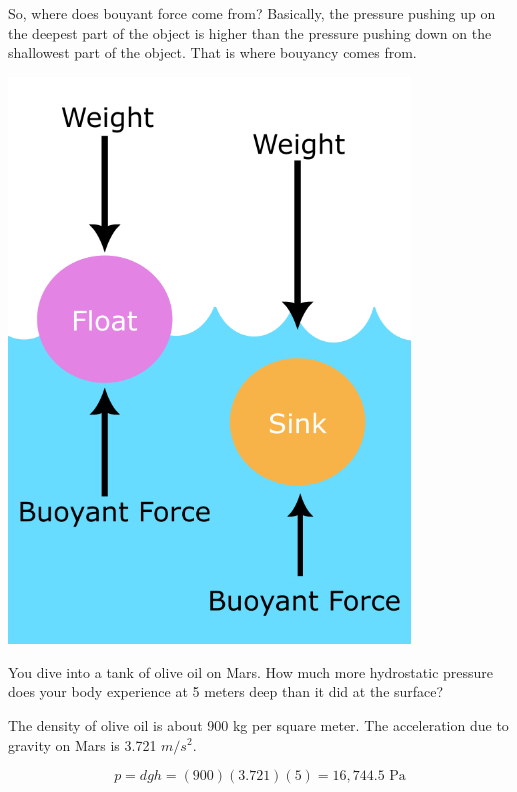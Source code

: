 So, where does bouyant force come from? Basically, the pressure pushing up on the
deepest part of the object is higher than the pressure pushing down on
the shallowest part of the object. That is where bouyancy comes from.

\includegraphics[width=0.8\textwidth]{Buoyancy_Diagram.png}


\begin{Exercise}[title={Hydrostatic Pressure}, label=mars_pressure]

  You dive into a tank of olive oil on Mars. How much more
  hydrostatic pressure does your body experience at 5 meters deep than
  it did at the surface?

  The density of olive oil is about 900 kg per square meter. The
  acceleration due to gravity on Mars is 3.721 $m/s^2$.
  
\end{Exercise}
\begin{Answer}[ref=mars_pressure]
$$p = d g h = (900)(3.721)(5) = 16,744.5 \text{ Pa}$$
\end{Answer}

